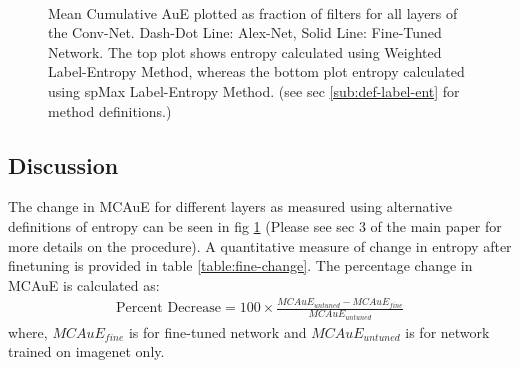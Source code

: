 \documentclass[runningheads]{llncs}
\begin{document}
\begin{figure}
\centering
{} \\
\caption{Mean Cumulative AuE plotted as fraction of filters for all layers of the Conv-Net. Dash-Dot Line: Alex-Net, Solid Line: Fine-Tuned Network. The top plot shows entropy calculated using Weighted Label-Entropy Method, whereas the bottom plot entropy calculated using spMax Label-Entropy Method. (see sec \ref{sub:def-label-ent} for method definitions.)}
\label{fig:fine-entropy}
\end{figure}

\subsection{Discussion}
The change in MCAuE for different layers as measured using alternative definitions of entropy can be seen in fig \ref{fig:fine-entropy} (Please see sec 3 of the main paper for more details on the procedure). A quantitative measure of change in entropy after finetuning is provided in table \ref{table:fine-change}. The percentage change in MCAuE is calculated as:
\begin{eqnarray}
\text{Percent Decrease} = 100 \times \frac{MCAuE_{untuned} - MCAuE_{fine}}{MCAuE_{untuned}}
\end{eqnarray}
where, $MCAuE_{fine}$ is for fine-tuned network and $MCAuE_{untuned}$ is for network trained on imagenet only.
\end{document}
